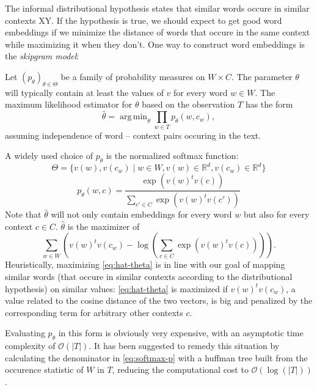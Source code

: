 \documentclass{amsart}
\theoremstyle{plain}
\theoremstyle{definition}
\newcommand{\R}{\mathbb{R}}
\DeclareMathOperator*{\argmin}{arg\,min}
\begin{document}
  The informal distributional hypothesis states that similar words occure in similar contexts XY.
  If the hypothesis is true, we should expect to get good word embeddings if we minimize the distance of words that occure in the same context while maximizing it when they don't.
  One way to construct word embeddings is the \emph{skipgram model}:

  Let $(p_\theta)_{\theta \in \Theta}$ be a family of probability measures on $W \times C$.
  The parameter $\theta$ will typically contain at least the values of $v$ for every word $w \in W$.
  The maximum likelihood estimator for $\theta$ based on the observation $T$ has the form
  \begin{equation*}
    \hat{\theta} = \argmin_{\theta} \prod_{w \in T} p_\theta(w, c_w),
  \end{equation*}
  assuming independence of word -- context pairs occuring in the text.

  A widely used choice of $p_\theta$ is the normalized softmax function:
  \begin{equation*}
    \label{eq:def-Theta}
    \Theta = \{v(w), v(c_w) \mid w \in W, v(w) \in \R^d, v(c_w) \in \R^d\}
  \end{equation*}
  \begin{equation}
    \label{eq:softmax-p}
    p_\theta(w, c) = \frac{\exp(v(w)^t v(c))}{\sum_{c' \in C} \exp(v(w)^t v(c'))}
  \end{equation}
  Note that $\hat\theta$ will not only contain embeddings for every word $w$ but also for every context $c \in C$.
  $\hat\theta$ is the maximizer of
  \begin{equation}
    \label{eq:hat-theta}
    \sum_{w \in W} \left( v(w)^t v(c_w) - \log \left(\sum_{c \in C} \exp(v(w)^t v(c))\right) \right).
  \end{equation}
  Heuristically, maximizing \ref{eq:hat-theta} is in line with our goal of mapping similar words (that occure in similar contexts according to the distributional hypothesis) on similar values:
  \ref{eq:hat-theta} is maximized if $v(w)^t v(c_w)$, a value related to the cosine distance of the two vectors, is big and penalized by the corresponding term for arbitrary other contexts $c$.

  Evaluating $p_\theta$ in this form is obviously very expensive, with an asymptotic time complexity of $\mathcal{O}(|T|)$.
  It has been suggested to remedy this situation by calculating the denominator in \ref{eq:softmax-p} with a huffman tree built from the occurence statistic of $W$ in $T$, reducing the computational cost to $\mathcal{O}(\log(|T|))$.
\end{document}
